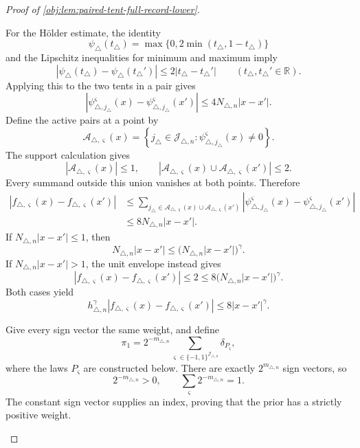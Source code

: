 \begin{proof}[Proof of \cref{obj:lem:paired-tent-full-record-lower}]
\begin{enumerate}
For the Hölder estimate, the identity
\[
\psi_\triangle(t_\triangle)
=\max\{0,2\min(t_\triangle,1-t_\triangle)\}
\]
and the Lipschitz inequalities for minimum and maximum imply
\[
|\psi_\triangle(t_\triangle)-\psi_\triangle(t_\triangle')|
\le2|t_\triangle-t_\triangle'|
\qquad(t_\triangle,t_\triangle'\in\mathbb R).
\]
Applying this to the two tents in a pair gives
\[
\left|
\psi_{\triangle,j_\triangle}^{\varsigma}(x)
-\psi_{\triangle,j_\triangle}^{\varsigma}(x')
\right|
\le4N_{\triangle,n}|x-x'|.
\]
Define the active pairs at a point by
\[
\mathscr A_{\triangle,\varsigma}(x)
=
\left\{
j_\triangle\in\mathscr J_{\triangle,n}:
\psi_{\triangle,j_\triangle}^{\varsigma}(x)\ne0
\right\}.
\]
The support calculation gives
\[
|\mathscr A_{\triangle,\varsigma}(x)|\le1,
\qquad
|\mathscr A_{\triangle,\varsigma}(x)
 \cup\mathscr A_{\triangle,\varsigma}(x')|\le2.
\]
Every summand outside this union vanishes at both points. Therefore
\[
\begin{aligned}
|f_{\triangle,\varsigma}(x)-f_{\triangle,\varsigma}(x')|
&\le
\sum_{j_\triangle\in
\mathscr A_{\triangle,\varsigma}(x)\cup
\mathscr A_{\triangle,\varsigma}(x')}
\left|
\psi_{\triangle,j_\triangle}^{\varsigma}(x)
-\psi_{\triangle,j_\triangle}^{\varsigma}(x')
\right|\\
&\le8N_{\triangle,n}|x-x'|.
\end{aligned}
\]
If \(N_{\triangle,n}|x-x'|\le1\), then
\[
N_{\triangle,n}|x-x'|
\le\bigl(N_{\triangle,n}|x-x'|\bigr)^\gamma.
\]
If \(N_{\triangle,n}|x-x'|>1\), the unit envelope instead gives
\[
|f_{\triangle,\varsigma}(x)-f_{\triangle,\varsigma}(x')|
\le2
\le8\bigl(N_{\triangle,n}|x-x'|\bigr)^\gamma.
\]
Both cases yield
\[
h_{\triangle,n}^{\gamma}
|f_{\triangle,\varsigma}(x)-f_{\triangle,\varsigma}(x')|
\le8|x-x'|^\gamma.
\]

Give every sign vector the same weight, and define
\[
\pi_1
=
2^{-m_{\triangle,n}}
\sum_{\varsigma\in\{-1,1\}^{\mathscr J_{\triangle,n}}}
\delta_{P_\varsigma},
\]
where the laws \(P_\varsigma\) are constructed below. There are exactly
\(2^{m_{\triangle,n}}\) sign vectors, so
\[
2^{-m_{\triangle,n}}>0,
\qquad
\sum_{\varsigma}2^{-m_{\triangle,n}}=1.
\]
The constant sign vector supplies an index, proving that the prior has a
strictly positive weight.


\end{enumerate}
\end{proof}
